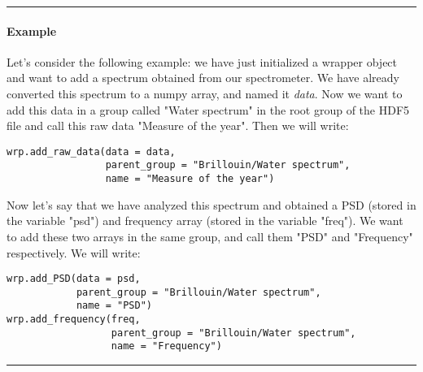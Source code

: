 \begin{center}
    \rule{15cm}{0.4pt}
\end{center}

\paragraph*{Example}
Let's consider the following example: we have just initialized a wrapper object and want to add a spectrum obtained from our spectrometer. We have already converted this spectrum to a numpy array, and named it \textit{data}. Now we want to add this data in a group called "Water spectrum" in the root group of the HDF5 file and call this raw data "Measure of the year". Then we will write:
\begin{lstlisting}
wrp.add_raw_data(data = data,
                 parent_group = "Brillouin/Water spectrum", 
                 name = "Measure of the year")
\end{lstlisting}

Now let's say that we have analyzed this spectrum and obtained a PSD (stored in the variable "psd") and frequency array (stored in the variable "freq"). We want to add these two arrays in the same group, and call them "PSD" and "Frequency" respectively. We will write:
\begin{lstlisting}
wrp.add_PSD(data = psd,
            parent_group = "Brillouin/Water spectrum", 
            name = "PSD")
wrp.add_frequency(freq,
                  parent_group = "Brillouin/Water spectrum", 
                  name = "Frequency")
\end{lstlisting}

\begin{center}
    \rule{15cm}{0.4pt}
\end{center}